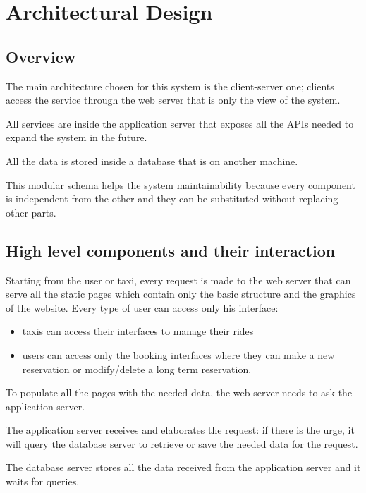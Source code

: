 \section{Architectural Design}
\subsection{Overview}
	The main architecture chosen for this system is the client-server one; clients access the service through the web server that is only the view of the system. 
	
	All services are inside the application server that exposes all the APIs needed to expand the system in the future.
	
	All the data is stored inside a database that is on another machine.

	This modular schema helps the system maintainability because every component is independent from the other and they can be substituted without replacing other parts. 
\subsection{High level components and their interaction}
	Starting from the user or taxi, every request is made to the web server that can serve all the static pages which contain only the basic structure and the graphics of the website. Every type of user can access only his interface:
	\begin{itemize} 
		\item taxis can access their interfaces to manage their rides 
		\item users can access only the booking interfaces where they can make a new reservation or modify/delete a long term reservation.
	\end{itemize}
	To populate all the pages with the needed data, the web server needs to ask the application server.
	
	The application server receives and elaborates the request: if there is the urge, it will query the database server to retrieve or save the needed data for the request.
	
	The database server stores all the data received from the application server and it waits for queries.
